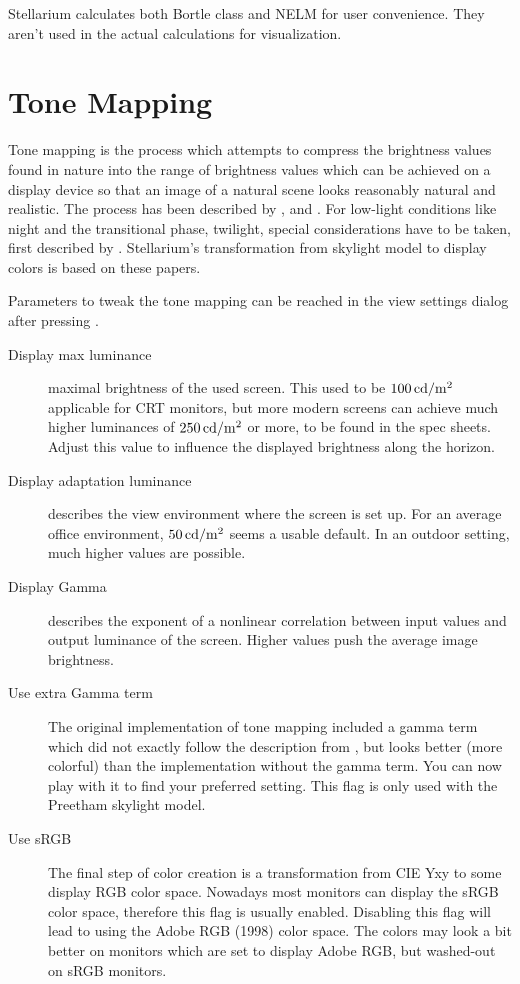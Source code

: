 Stellarium calculates both Bortle class and NELM for user convenience. They aren't used in the actual calculations for visualization.

\section{Tone Mapping}

Tone mapping is the process which attempts to compress the brightness
values found in nature into the range of brightness values which can
be achieved on a display device so that an image of a natural scene looks reasonably natural
and realistic. The process has been described by
\citet{TumblinRushmeier:1993}, \citet{Larson:1997} and
\citet{DevlinChalmersWilkie:2002}. For low-light conditions like night
and the transitional phase, twilight, special considerations have to
be taken, first described by \citet{WannJensen:2000}.
Stellarium's transformation from skylight model to display colors is based on these papers.

Parameters to tweak the tone mapping can be reached in the view
settings dialog after pressing .

\begin{description}
\item[Display max luminance] maximal brightness of the used
  screen. This used to be $100 \,\mathrm{cd}/\mathrm{m}^2$ applicable for CRT monitors,
  but more modern screens can achieve much higher luminances of $250
  \,\mathrm{cd}/\mathrm{m}^2$ or more, to be found in the spec sheets. Adjust this value
  to influence the displayed brightness along the horizon.
\item[Display adaptation luminance] describes the view environment
  where the screen is set up. For an average office environment,
  $50 \,\mathrm{cd}/\mathrm{m}^2$ seems a usable default. In an outdoor setting, much
  higher values are possible.
\item[Display Gamma] describes the exponent of a nonlinear correlation
  between input values and output luminance of the screen. Higher
  values push the average image brightness.
\item[Use extra Gamma term] The original implementation of tone
  mapping included a gamma term which did not exactly follow the
  description from \citet{Larson:1997}, but looks better (more
  colorful) than the implementation without the gamma term. You can
  now play with it to find your preferred setting. This flag is only
  used with the Preetham skylight model.
\item[Use sRGB] The final step of color creation is a transformation
  from CIE Yxy to some display RGB color space. Nowadays most monitors
  can display the sRGB color space, therefore this flag is usually
  enabled. Disabling this flag will lead to using the Adobe RGB
  (1998) color space. The colors may look a bit better on monitors
  which are set to display Adobe RGB, but washed-out on sRGB monitors.
\end{description}



